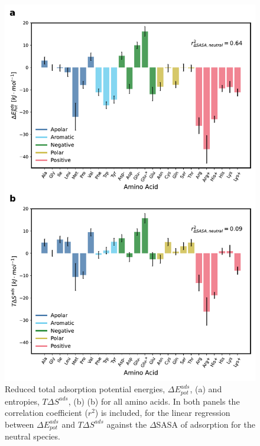 \documentclass[journal=jcisd8,manuscript=article,layout=twocolumn]{achemso}
\begin{document}
\begin{figure}[htbp]
\centerline{\includegraphics[width=\columnwidth]{figures/Fig4.pdf}}
\caption[]{\label{fig:EneCorr} Reduced total adsorption potential energies, $\Delta E_{pot}^{ads}$, (a) and entropies, $T\Delta S^{ads}$, (b) (b) for all amino acids. In both panels the correlation coefficient ($r^2$) is included, for the linear regression between $\Delta E_{pot}^{ads}$ and $ T\Delta S^{ads}$ against the $\Delta$SASA of adsorption for the neutral species.}
\end{figure}
\end{document}
